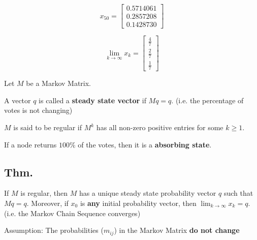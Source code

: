 \documentclass[12pt]{article}
\begin{document}
\begin{equation*}
  x_{50} = 
  \begin{bmatrix}
    0.5714061 \\
    0.2857208 \\
    0.1428730
  \end{bmatrix}
\end{equation*}

\begin{equation*}
  \lim_{k \to \infty} x_k = 
  \begin{bmatrix}
    \frac{4}{7} \\
    \frac{2}{7} \\
    \frac{1}{7}
  \end{bmatrix}
\end{equation*}

Let $M$ be a Markov Matrix.

A vector $q$ is called a \textbf{steady state vector} if $Mq = q$. 
(i.e. the percentage of votes is not changing)

$M$ is said to be regular if $M^k$ has all non-zero positive entries for some
$k \geq 1$.

If a node returns $100\%$ of the votes, then it is a \textbf{absorbing state}.

\subsection*{Thm.}

If $M$ is regular, then $M$ has a unique steady state probability vector $q$
such that $Mq = q$. Moreover, if $x_0$ is \textbf{any} initial probability vector,
then $\lim_{k \to \infty} x_k = q$. (i.e. the Markov Chain Sequence converges)

Assumption: The probabilities ($m_{ij}$) in the Markov Matrix \textbf{do not change}
\end{document}
